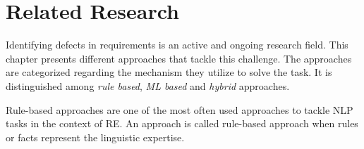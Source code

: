\chapter{Related Research}
\label{chp:related_research}
Identifying defects in requirements is an active and ongoing research field.
This chapter presents different approaches that tackle this challenge.
The approaches are categorized regarding the mechanism they utilize to solve the task.
It is distinguished among \textit{rule based}, \textit{\ac{ML} based} and \textit{hybrid} approaches. %

Rule-based approaches are one of the most often used approaches to tackle \ac{NLP} tasks in the context of \ac{RE}.
An approach is called rule-based approach when rules or facts represent the linguistic expertise. \parencite{Zhao:2020}



% 
